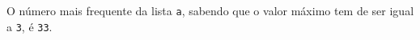 \documentclass[12pt,varwidth=16cm,border=1pt]{standalone}
\begin{document}
O número mais frequente da lista \verb+a+, sabendo que o valor máximo tem de ser igual a \verb+3+, é \verb+33+.

\questiomtrue
\end{document}
